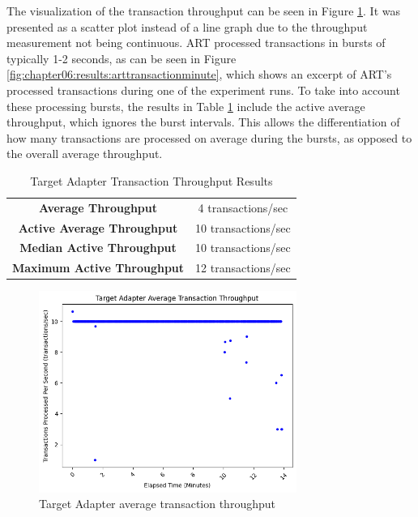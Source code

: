 The visualization of the transaction throughput can be seen in Figure \ref{fig:chapter06:results:artavgtransaction}. It was presented as a scatter plot instead of a line graph due to the throughput measurement not being continuous. \ac{ART} processed transactions in bursts of typically 1-2 seconds, as can be seen in Figure \ref{fig:chapter06:results:arttransactionminute}, which shows an excerpt of \ac{ART}'s processed transactions during one of the experiment runs. To take into account these processing bursts, the results in Table \ref{tab:art:transactionthroughput} include the active average throughput, which ignores the burst intervals. This allows the differentiation of how many transactions are processed on average during the bursts, as opposed to the overall average throughput.

\begin{table}
    \centering
    \begin{tabular}{|cc|}
        \hline
         \textbf{Average Throughput} & 4 transactions/sec \\
         \textbf{Active Average Throughput} & 10 transactions/sec \\
         \textbf{Median Active Throughput} & 10 transactions/sec \\
         \textbf{Maximum Active Throughput} & 12 transactions/sec \\
        \hline
    \end{tabular}
    \caption{Target Adapter Transaction Throughput Results}
    \label{tab:art:transactionthroughput}
\end{table}

\begin{figure}[htbp]
    \centering
    \includegraphics[width=0.75\textwidth]{chapters/images/art-performance/art-avg-transaction-throughput.png}
    \caption{Target Adapter average transaction throughput}
    \label{fig:chapter06:results:artavgtransaction}
\end{figure}

